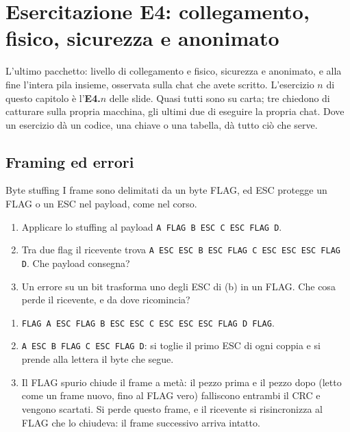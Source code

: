 \chapter{Esercitazione E4: collegamento, fisico, sicurezza e anonimato}

L'ultimo pacchetto: livello di collegamento e fisico, sicurezza e anonimato, e alla fine l'intera pila insieme, osservata sulla chat che
avete scritto. L'esercizio $n$ di questo capitolo è l'\textbf{E4.$n$} delle slide. Quasi tutti sono su carta; tre chiedono di catturare
sulla propria macchina, gli ultimi due di eseguire la propria chat. Dove un esercizio dà un codice, una chiave o una tabella, dà tutto ciò
che serve.


\section{Framing ed errori}

\begin{esercizio}{Byte stuffing}
I frame sono delimitati da un byte FLAG, ed ESC protegge un FLAG o un ESC nel payload, come nel corso.
\begin{enumerate}[label=(\alph*)]
    \item Applicare lo stuffing al payload \texttt{A FLAG B ESC C ESC FLAG D}.
    \item Tra due flag il ricevente trova \texttt{A ESC ESC B ESC FLAG C ESC ESC ESC FLAG D}. Che payload consegna?
    \item Un errore su un bit trasforma uno degli ESC di (b) in un FLAG. Che cosa perde il ricevente, e da dove ricomincia?
\end{enumerate}

\svolgimento
\begin{enumerate}[label=(\alph*)]
    \item \texttt{FLAG A ESC FLAG B ESC ESC C ESC ESC ESC FLAG D FLAG}.
    \item \texttt{A ESC B FLAG C ESC FLAG D}: si toglie il primo ESC di ogni coppia e si prende alla lettera il byte che segue.
    \item Il FLAG spurio chiude il frame a metà: il pezzo prima e il pezzo dopo (letto come un frame nuovo, fino al FLAG vero) falliscono
          entrambi il CRC e vengono scartati. Si perde questo frame, e il ricevente si risincronizza al FLAG che lo chiudeva: il frame
          successivo arriva intatto.
\end{enumerate}
\end{esercizio}

